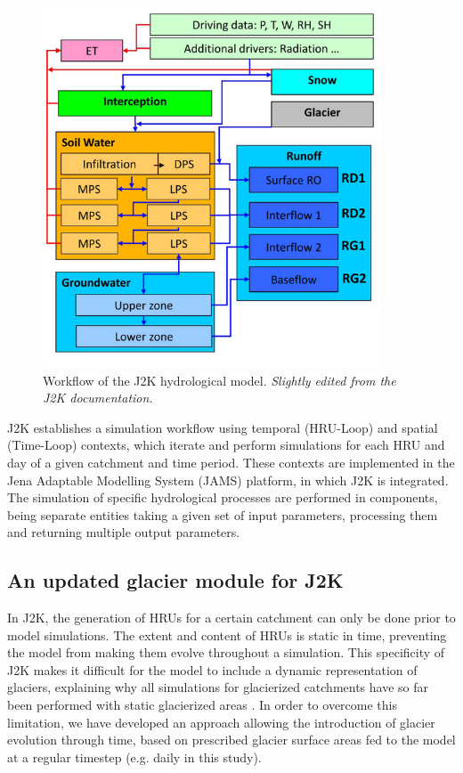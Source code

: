\begin{figure}[h]
\centering
\includegraphics[width=10cm]{Figures/hydro/Figure_1.png}
\caption{Workflow of the J2K hydrological model. \textit{Slightly edited from the J2K documentation.}} 
\label{hydro:fig1}
\end{figure}

J2K establishes a simulation workflow using temporal (HRU-Loop) and spatial (Time-Loop) contexts, which iterate and perform simulations for each HRU and day of a given catchment and time period. These contexts are implemented in the Jena Adaptable Modelling System (JAMS) platform, in which J2K is integrated. The simulation of specific hydrological processes are performed in components, being separate entities taking a given set of input parameters, processing them and returning multiple output parameters. 

\subsection{An updated glacier module for J2K}

In J2K, the generation of HRUs for a certain catchment can only be done prior to model simulations. The extent and content of HRUs is static in time, preventing the model from making them evolve throughout a simulation. This specificity of J2K makes it difficult for the model to include a dynamic representation of glaciers, explaining why all simulations for glacierized catchments have so far been performed with static glacierized areas \citep{gao_test_2012, nepal_understanding_2014}. In order to overcome this limitation, we have developed an approach allowing the introduction of glacier evolution through time, based on prescribed glacier surface areas fed to the model at a regular timestep (e.g. daily in this study). 

